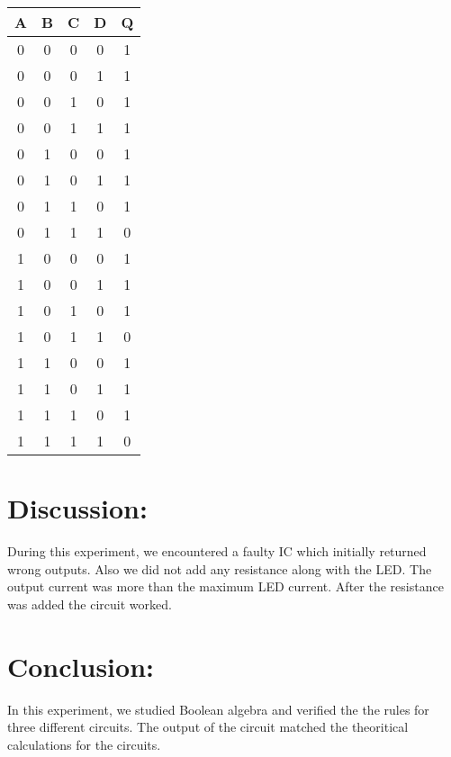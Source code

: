 \documentclass[12pt]{article}
\begin{document}
\begin{table}[H]
	\centering
	\begin{tabular}{|c|c|c|c||c|}
		\hline
		\textbf{A} & \textbf{B} & \textbf{C} & \textbf{D} & \textbf{Q} \\
		\hline \hline
		0 & 0 & 0 & 0 & 1 \\
		\hline
		0 & 0 & 0 & 1 & 1 \\
		\hline
		0 & 0 & 1 & 0 & 1 \\
		\hline
		0 & 0 & 1 & 1 & 1 \\
		\hline
		0 & 1 & 0 & 0 & 1 \\
		\hline
		0 & 1 & 0 & 1 & 1 \\
		\hline
		0 & 1 & 1 & 0 & 1 \\
		\hline
		0 & 1 & 1 & 1 & 0 \\
		\hline
		1 & 0 & 0 & 0 & 1 \\
		\hline
		1 & 0 & 0 & 1 & 1 \\
		\hline
		1 & 0 & 1 & 0 & 1 \\
		\hline
		1 & 0 & 1 & 1 & 0 \\
		\hline
		1 & 1 & 0 & 0 & 1 \\
		\hline
		1 & 1 & 0 & 1 & 1 \\
		\hline
		1 & 1 & 1 & 0 & 1 \\
		\hline
		1 & 1 & 1 & 1 & 0 \\
		\hline
	\end{tabular}
\end{table}
\section{Discussion:}
During this experiment, we encountered a faulty IC which initially returned wrong outputs. Also we did not add any resistance along with the LED. The output current was more than the maximum LED current. After the resistance was added the circuit worked.
\section{Conclusion:}
In this experiment, we studied Boolean algebra and verified the the rules for three different circuits. The output of the circuit matched the theoritical calculations for the circuits.
\end{document}
